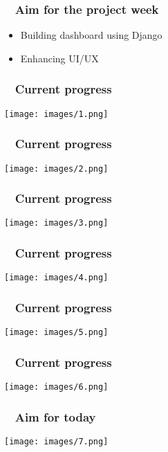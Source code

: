 \documentclass[xcolor={dvipsnames}]{beamer}
\begin{document}
\begin{frame}
\frametitle{ ~ Aim for the project week} 
\begin{itemize}
\item{Building dashboard using Django}
\item{Enhancing UI/UX}
\end{itemize}
\end{frame}



\begin{frame}
\frametitle{ ~ Current progress}
\begin{center}
\texttt{[image: images/1.png]}
\end{center}
\end{frame}

\begin{frame}
\frametitle{ ~ Current progress}
\begin{center}
\texttt{[image: images/2.png]}
\end{center}
\end{frame}


\begin{frame}
\frametitle{ ~ Current progress}
\begin{center}
\texttt{[image: images/3.png]}
\end{center}
\end{frame}

\begin{frame}
\frametitle{ ~ Current progress}
\begin{center}
\texttt{[image: images/4.png]}
\end{center}
\end{frame}

\begin{frame}
\frametitle{ ~ Current progress}
\begin{center}
\texttt{[image: images/5.png]}
\end{center}
\end{frame}

\begin{frame}
\frametitle{ ~ Current progress}
\begin{center}
\texttt{[image: images/6.png]}
\end{center}
\end{frame}


\begin{frame}
\frametitle{ ~ Aim for today}
\begin{center}
\texttt{[image: images/7.png]}
\end{center}
\end{frame}
\end{document}
